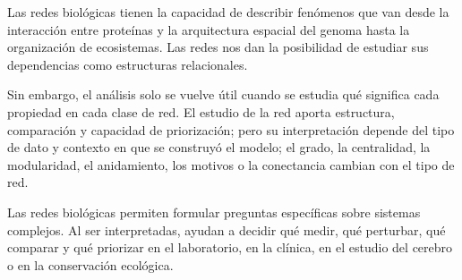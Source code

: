 \documentclass[11pt]{article}
\begin{document}
Las redes biológicas tienen la capacidad de describir fenómenos que van desde la interacción entre proteínas y la arquitectura espacial del genoma hasta la organización de ecosistemas. Las redes nos dan la posibilidad de estudiar sus dependencias como estructuras relacionales.

Sin embargo, el análisis solo se vuelve útil cuando se estudia qué significa cada propiedad en cada clase de red. El estudio de la red aporta estructura, comparación y capacidad de priorización; pero su interpretación depende del tipo de dato y contexto en que se construyó el modelo; el grado, la centralidad, la modularidad, el anidamiento, los motivos o la conectancia cambian con el tipo de red. 

Las redes biológicas permiten formular preguntas específicas sobre sistemas complejos. Al ser  interpretadas, ayudan a decidir qué medir, qué perturbar, qué comparar y qué priorizar en el laboratorio, en la clínica, en el estudio del cerebro o en la conservación ecológica.


\printbibliography[title={Referencias}]
\end{document}
